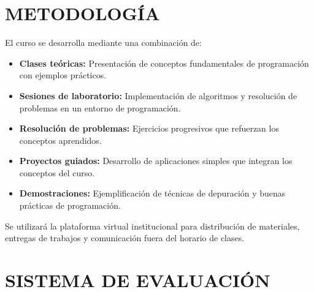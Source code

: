 \documentclass[12pt,a4paper]{article}
\begin{document}
\section{METODOLOGÍA}
\begin{tcolorbox}[colback=pucpGris!5,colframe=pucpGris,title=\textbf{Enfoque Metodológico}]
El curso se desarrolla mediante una combinación de:

\begin{itemize}[leftmargin=*]
    \item \textbf{Clases teóricas:} Presentación de conceptos fundamentales de programación con ejemplos prácticos.
    \item \textbf{Sesiones de laboratorio:} Implementación de algoritmos y resolución de problemas en un entorno de programación.
    \item \textbf{Resolución de problemas:} Ejercicios progresivos que refuerzan los conceptos aprendidos.
    \item \textbf{Proyectos guiados:} Desarrollo de aplicaciones simples que integran los conceptos del curso.
    \item \textbf{Demostraciones:} Ejemplificación de técnicas de depuración y buenas prácticas de programación.
\end{itemize}

\begin{center}
\end{center}

Se utilizará la plataforma virtual institucional para distribución de materiales, entregas de trabajos y comunicación fuera del horario de clases.
\end{tcolorbox}
\vspace{0.5cm}

\section{SISTEMA DE EVALUACIÓN}
\end{document}
